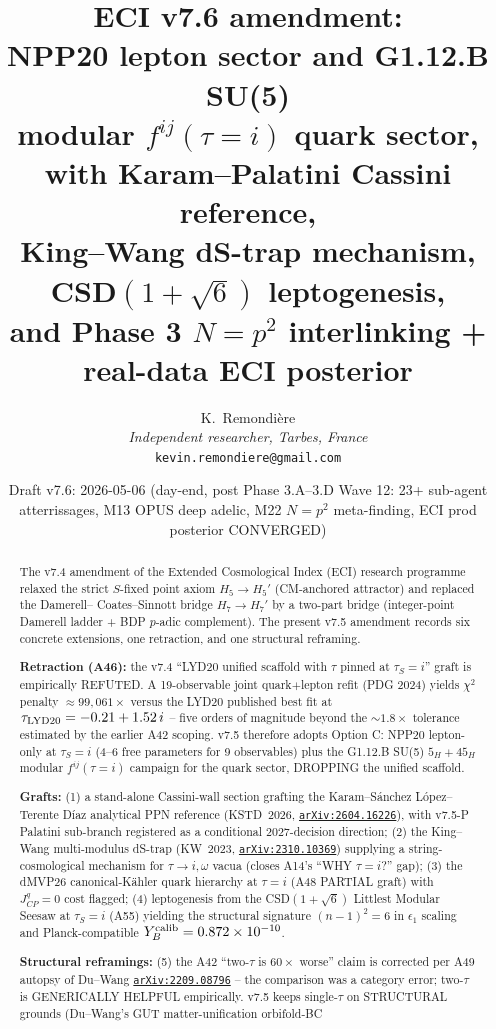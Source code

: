 \documentclass[a4paper,11pt]{article}
\title{ECI v7.6 amendment:\\
       NPP20 lepton sector and G1.12.B SU(5)\\
       modular $f^{ij}(\tau=i)$ quark sector,\\
       with Karam--Palatini Cassini reference,\\
       King--Wang dS-trap mechanism,\\
       CSD$(1+\sqrt 6)$ leptogenesis,\\
       and Phase 3 $N=p^{2}$ interlinking + real-data ECI posterior}
\author{%
  K.~Remondi\`ere%
  \\[2ex]
  \small\textit{Independent researcher, Tarbes, France}\\
  \small\texttt{kevin.remondiere@gmail.com}
}
\date{Draft v7.6: 2026-05-06 (day-end, post Phase 3.A--3.D Wave 12: 23+ sub-agent atterrissages, M13 OPUS deep adelic, M22 $N=p^{2}$ meta-finding, ECI prod posterior CONVERGED)}
\newcommand{\arXiv}[1]{\href{https://arxiv.org/abs/#1}{\texttt{arXiv:#1}}}
\theoremstyle{definition}
\theoremstyle{remark}
\begin{document}
\maketitle

\begin{abstract}
The v7.4 amendment of the Extended Cosmological Index (ECI) research
programme~\cite{V74amend} relaxed the strict $S$-fixed point axiom
$H_5\to H_5'$ (CM-anchored attractor) and replaced the Damerell--%
Coates--Sinnott bridge $H_7\to H_7'$ by a two-part bridge
(integer-point Damerell ladder + BDP $p$-adic complement).  The
present v7.5 amendment records six concrete extensions, one
retraction, and one structural reframing.
\par
\textbf{Retraction (A46):} the v7.4 ``LYD20 unified scaffold with $\tau$
pinned at $\tau_S=i$'' graft is empirically REFUTED.  A 19-observable
joint quark$+$lepton refit (PDG 2024) yields $\chi^2$ penalty
$\approx 99{,}061\times$ versus the LYD20 published best fit at
$\tau_{\rm LYD20}=-0.21+1.52\,i$ -- five orders of magnitude beyond
the $\sim 1.8\times$ tolerance estimated by the earlier A42 scoping.
v7.5 therefore adopts Option C: NPP20 lepton-only at $\tau_S=i$ (4--6
free parameters for 9 observables) plus the G1.12.B SU(5)
$5_H+45_H$ modular $f^{ij}(\tau=i)$ campaign for the quark sector,
DROPPING the unified scaffold.
\par
\textbf{Grafts:} (1) a stand-alone Cassini-wall section grafting the
Karam--S\'anchez L\'opez--Terente D\'iaz analytical PPN reference
(KSTD~2026, \arXiv{2604.16226}), with v7.5-P Palatini sub-branch
registered as a conditional 2027-decision direction;
(2) the King--Wang multi-modulus dS-trap (KW~2023,
\arXiv{2310.10369}) supplying a string-cosmological mechanism for
$\tau\to i,\omega$ vacua (closes A14's ``WHY $\tau=i$?'' gap);
(3) the dMVP26 canonical-K\"ahler quark hierarchy at $\tau=i$
(A48 PARTIAL graft) with $J_{CP}^{q}=0$ cost flagged; (4) leptogenesis
from the CSD$(1+\sqrt 6)$ Littlest Modular Seesaw at $\tau_S=i$
(A55) yielding the structural signature
$(n-1)^{2}=6$ in $\epsilon_1$ scaling and Planck-compatible
$Y_B^{\rm calib}=0.872\times 10^{-10}$.
\par
\textbf{Structural reframings:} (5) the A42 ``two-$\tau$ is $60\times$
worse'' claim is corrected per A49 autopsy of Du--Wang
\arXiv{2209.08796} -- the comparison was a category error; two-$\tau$
is GENERICALLY HELPFUL empirically.  v7.5 keeps single-$\tau$ on
STRUCTURAL grounds (Du--Wang's GUT matter-unification orbifold-BC

\end{abstract}
\end{document}
